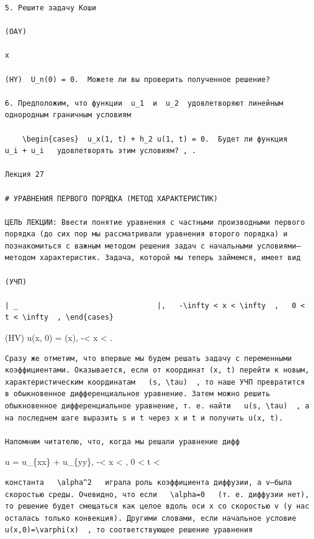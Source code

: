 \documentclass[
  ukrainian,
]{article}
\begin{document}
\begin{verbatim}
5. Решите задачу Коши

(OAY)

x

(HY)  U_n(0) = 0.  Можете ли вы проверить полученное решение?

6. Предположим, что функции  u_1  и  u_2  удовлетворяют линейным однородным граничным условиям

    \begin{cases}  u_x(1, t) + h_2 u(1, t) = 0.  Будет ли функция   u_i + u_i   удовлетворять этим условиям? , .

Лекция 27

# УРАВНЕНИЯ ПЕРВОГО ПОРЯДКА (МЕТОД ХАРАКТЕРИСТИК)

ЦЕЛЬ ЛЕКЦИИ: Ввести понятие уравнения с частными производными первого порядка (до сих пор мы рассматривали уравнения второго порядка) и познакомиться с важным методом решения задач с начальными условиями—методом характеристик. Задача, которой мы теперь займемся, имеет вид

(УЧП)

| _                                |,   -\infty < x < \infty  ,   0 < t < \infty  , \end{cases}
\end{verbatim}

(HV) u(x, 0) = \varphi(x), \quad -\infty \textless{} x \textless{}
\infty.

\begin{verbatim}
Сразу же отметим, что впервые мы будем решать задачу с переменными коэффициентами. Оказывается, если от координат (x, t) перейти к новым, характеристическим координатам   (s, \tau)  , то наше УЧП превратится в обыкновенное дифференциальное уравнение. Затем можно решить обыкновенное дифференциальное уравнение, т. е. найти   u(s, \tau)  , а на последнем шаге выразить s и t через x и t и получить u(x, t).

Напомним читателю, что, когда мы решали уравнение дифф
\end{verbatim}

\Delta u = u\_\{xx\} + u\_\{yy\}, -\infty \textless{} x \textless{}
\infty  , 0 \textless{} t \textless{} \infty

\begin{verbatim}
константа   \alpha^2   играла роль коэффициента диффузии, а v—была скоростью среды. Очевидно, что если   \alpha=0   (т. е. диффузии нет), то решение будет смещаться как целое вдоль оси x со скоростью v (у нас осталась только конвекция). Другими словами, если начальное условие   u(x,0)=\varphi(x)  , то соответствующее решение уравнения
\end{verbatim}
\end{document}

